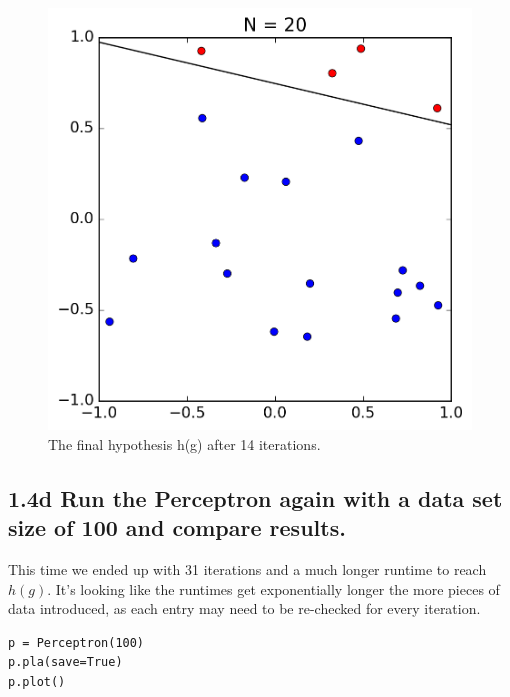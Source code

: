 \documentclass[11pt]{article}
\begin{document}
\begin{figure}[!htb]
	\includegraphics{14c.png}
	\caption{The final hypothesis h(g) after 14 iterations.}
\end{figure}
\newpage

\subsection*{1.4d Run the Perceptron again with a data set size of 100 and compare results.}

This time we ended up with 31 iterations and a much longer runtime to reach $h(g)$. It's looking like the runtimes get exponentially longer the more pieces of data introduced, as each entry may need to be re-checked for every iteration.

\begin{lstlisting}[frame=single]
p = Perceptron(100)
p.pla(save=True)
p.plot()
\end{lstlisting}
\end{document}
